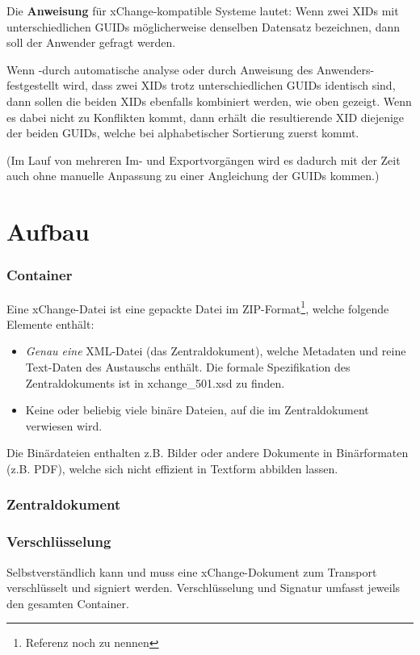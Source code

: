 \documentclass[a4paper]{scrartcl}
\begin{document}
\begin{enumerate}
    Die \textbf{Anweisung} für xChange-kompatible Systeme lautet: Wenn zwei XIDs mit unterschiedlichen GUIDs möglicherweise denselben Datensatz bezeichnen, dann soll der Anwender gefragt werden. 
    
    Wenn -durch automatische analyse oder durch Anweisung des Anwenders- festgestellt wird, dass zwei XIDs trotz unterschiedlichen GUIDs identisch sind, dann sollen die beiden XIDs ebenfalls kombiniert werden, wie oben gezeigt. Wenn es dabei nicht zu Konflikten kommt, dann erhält die resultierende XID diejenige der beiden GUIDs, welche bei alphabetischer Sortierung zuerst kommt.
    
    (Im Lauf von mehreren Im- und Exportvorgängen wird es dadurch mit der Zeit auch ohne manuelle Anpassung zu einer Angleichung der GUIDs kommen.)
    
\end{enumerate}


\part{Aufbau}
\section{Container}
Eine xChange-Datei ist eine gepackte Datei im ZIP-Format\footnote{Referenz noch zu nennen}, welche folgende Elemente enthält:
\begin{itemize}
\item \textit{Genau eine} XML-Datei (das Zentraldokument), welche Metadaten und reine Text-Daten des Austauschs enthält. Die formale Spezifikation des Zentraldokuments ist in xchange\_501.xsd zu finden.
\item Keine oder beliebig viele binäre Dateien, auf die im Zentraldokument verwiesen wird.
\end{itemize}
Die Binärdateien enthalten z.B. Bilder oder andere Dokumente in Binärformaten (z.B. PDF), welche sich nicht effizient in Textform abbilden lassen.

\section{Zentraldokument}

\section{Verschlüsselung}
Selbstverständlich kann und muss eine xChange-Dokument zum Transport verschlüsselt und signiert werden. Verschlüsselung und Signatur umfasst jeweils den gesamten Container.
\end{document}

